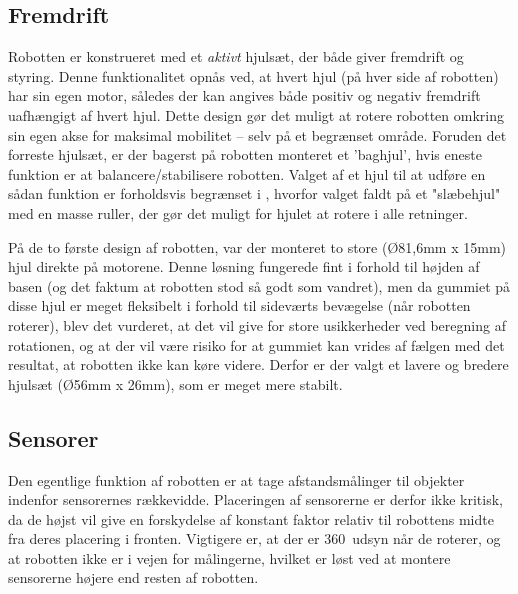 \subsection{Fremdrift}
Robotten er konstrueret med et \textit{aktivt} hjulsæt, der både giver fremdrift og styring.
Denne funktionalitet opnås ved, at hvert hjul (på hver side af robotten) har sin egen motor, således der kan angives både positiv og negativ fremdrift uafhængigt af hvert hjul.
Dette design gør det muligt at rotere robotten omkring sin egen akse for maksimal mobilitet -- selv på et begrænset område.
Foruden det forreste hjulsæt, er der bagerst på robotten monteret et 'baghjul', hvis eneste funktion er at balancere/stabilisere robotten.
Valget af et hjul til at udføre en sådan funktion er forholdsvis begrænset i \lego, hvorfor valget faldt på et "slæbehjul" med en masse ruller, der gør det muligt for hjulet at rotere i alle retninger.

På de to første design af robotten, var der monteret to store (Ø81,6mm x 15mm) hjul direkte på motorene.
Denne løsning fungerede fint i forhold til højden af basen (og det faktum at robotten stod så godt som vandret), men da gummiet på disse hjul er meget fleksibelt i forhold til sideværts bevægelse (når robotten roterer), blev det vurderet, at det vil give for store usikkerheder ved beregning af rotationen, og at der vil være risiko for at gummiet kan vrides af fælgen med det resultat, at robotten ikke kan køre videre.
Derfor er der valgt et lavere og bredere hjulsæt (Ø56mm x 26mm), som er meget mere stabilt.

\subsection{Sensorer}

Den egentlige funktion af robotten er at tage afstandsmålinger til objekter indenfor sensorernes rækkevidde.
Placeringen af sensorerne er derfor ikke kritisk, da de højst vil give en forskydelse af konstant faktor relativ til robottens midte fra deres placering i fronten.
Vigtigere er, at der er 360\degree~udsyn når de roterer, og at robotten ikke er i vejen for målingerne, hvilket er løst ved at montere sensorerne højere end resten af robotten. 



